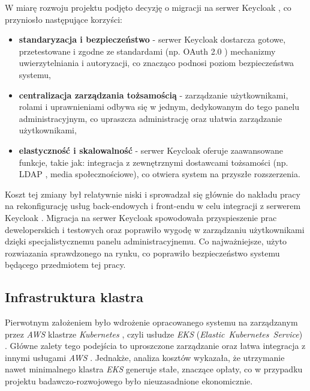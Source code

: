 W miarę rozwoju projektu podjęto decyzję o migracji na serwer Keycloak \cite{keycloak_docs}, co przyniosło następujące korzyści:
\begin{itemize}
    \item \textbf{standaryzacja i bezpieczeństwo} - serwer Keycloak \cite{keycloak_docs} dostarcza gotowe, przetestowane i zgodne ze standardami (np. OAuth 2.0 \cite{oauth2_rfc}) mechanizmy uwierzytelniania i autoryzacji, co znacząco podnosi poziom bezpieczeństwa systemu,
    \item \textbf{centralizacja zarządzania tożsamością} - zarządzanie użytkownikami, rolami i uprawnieniami odbywa się w jednym, dedykowanym do tego panelu administracyjnym, co upraszcza administrację oraz ułatwia zarządzanie użytkownikami,
    \item \textbf{elastyczność i skalowalność} - serwer Keycloak \cite{keycloak_docs} oferuje zaawansowane funkcje, takie jak: integracja z zewnętrznymi dostawcami tożsamości (np. LDAP \cite{ldap_rfc}, media społecznościowe), co otwiera system na przyszłe rozszerzenia.
\end{itemize}

\vspace{0.3em}

Koszt tej zmiany był relatywnie niski i sprowadzał się głównie do nakładu pracy na rekonfigurację usług back-endowych i front-endu w celu integracji z serwerem Keycloak \cite{keycloak_docs}. Migracja na serwer Keycloak \cite{keycloak_docs} spowodowała przyspieszenie prac deweloperskich i testowych oraz poprawiło wygodę w zarządzaniu użytkownikami dzięki specjalistycznemu panelu administracyjnemu. Co najważniejsze, użyto rozwiazania sprawdzonego na rynku, co poprawiło bezpieczeństwo systemu będącego przedmiotem tej pracy.

\subsection{Infrastruktura klastra}

Pierwotnym założeniem było wdrożenie opracowanego systemu na zarządzanym przez \textit{AWS} \cite{aws_docs} klastrze \textit{Kubernetes} \cite{kubernetes}, czyli usłudze \textit{EKS} (\mbox{\textit{Elastic Kubernetes Service}}) \cite{eks_docs}. Główne zalety tego podejścia to uproszczone zarządzanie oraz łatwa integracja z innymi usługami \textit{AWS} \cite{aws_docs}. Jednakże, analiza kosztów wykazała, że utrzymanie nawet minimalnego klastra \textit{EKS} \cite{eks_docs} generuje stałe, znaczące opłaty, co w przypadku projektu badawczo-rozwojowego było nieuzasadnione ekonomicznie.

